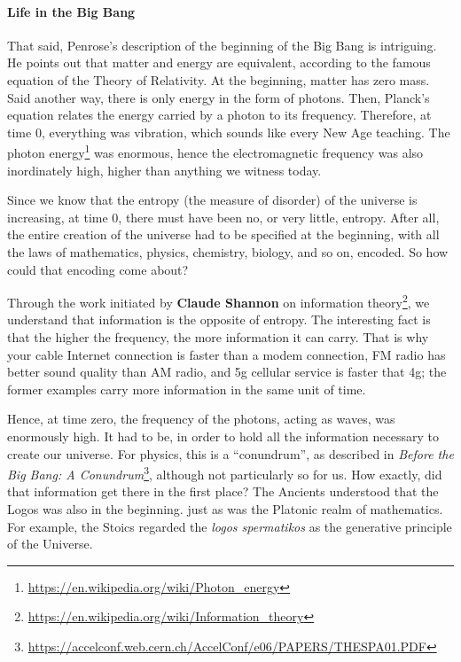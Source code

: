 \paragraph{Life in the Big Bang}


That said, Penrose's description of the beginning of the Big Bang is intriguing. He points out that matter and energy are equivalent, according to the famous equation of the Theory of Relativity. At the beginning, matter has zero mass. Said another way, there is only energy in the form of photons. Then, Planck's equation relates the energy carried by a photon to its frequency. Therefore, at time 0, everything was vibration, which sounds like every New Age teaching. The photon energy\footnote{\url{https://en.wikipedia.org/wiki/Photon_energy}} was enormous, hence the electromagnetic frequency was also inordinately high, higher than anything we witness today.

Since we know that the entropy (the measure of disorder) of the universe is increasing, at time 0, there must have been no, or very little, entropy. After all, the entire creation of the universe had to be specified at the beginning, with all the laws of mathematics, physics, chemistry, biology, and so on, encoded. So how could that encoding come about?

Through the work initiated by \textbf{Claude Shannon} on information theory\footnote{\url{https://en.wikipedia.org/wiki/Information_theory}}, we understand that information is the opposite of entropy. The interesting fact is that the higher the frequency, the more information it can carry. That is why your cable Internet connection is faster than a modem connection, FM radio has better sound quality than AM radio, and 5g cellular service is faster that 4g; the former examples carry more information in the same unit of time.

Hence, at time zero, the frequency of the photons, acting as waves, was enormously high. It had to be, in order to hold all the information necessary to create our universe. For physics, this is a ``conundrum'', as described in \textit{Before the Big Bang: A Conundrum}\footnote{\url{https://accelconf.web.cern.ch/AccelConf/e06/PAPERS/THESPA01.PDF}}, although not particularly so for us. How exactly, did that information get there in the first place? The Ancients understood that the Logos was also in the beginning. just as was the Platonic realm of mathematics. For example, the Stoics regarded the \emph{logos spermatikos} as the generative principle of the Universe.


